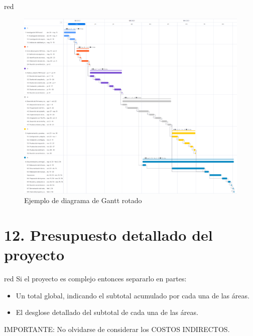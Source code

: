 \documentclass[
11pt, %
]{charter}
\begin{document}
\begin{consigna}{red}
\begin{landscape}
\begin{figure}[htpb]
\centering 
\includegraphics[height=.85\textheight]{./Figuras/Gantt-2.png}
\caption{Ejemplo de diagrama de Gantt rotado}
\label{fig:diagGantt}
\end{figure}

\end{landscape}

\end{consigna}


\section{12. Presupuesto detallado del proyecto}
\label{sec:presupuesto}

\begin{consigna}{red}
Si el proyecto es complejo entonces separarlo en partes:
\begin{itemize}
	\item Un total global, indicando el subtotal acumulado por cada una de las áreas.
	\item El desglose detallado del subtotal de cada una de las áreas.
\end{itemize}

IMPORTANTE: No olvidarse de considerar los COSTOS INDIRECTOS.

\end{consigna}
\end{document}
